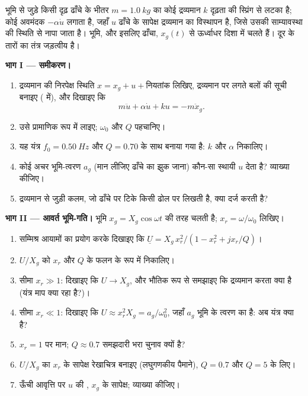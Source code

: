 \begin{problem}
\label{pb:b1:oscillators-resonance:1}
भूमि से जुड़े किसी दृढ़ ढाँचे के भीतर $m = \qty{1.0}{kg}$ का कोई द्रव्यमान
$k$ दृढ़ता की स्प्रिंग से लटका है; कोई अवमंदक $-\alpha\dot u$ लगाता है, जहाँ
$u$ ढाँचे के सापेक्ष द्रव्यमान का विस्थापन है, जिसे उसकी साम्यावस्था की
स्थिति से नापा जाता है। भूमि, और इसलिए ढाँचा, $x_g(t)$ से ऊर्ध्वाधर दिशा
में चलते हैं। दूर के तारों का तंत्र जड़त्वीय है।

\medskip
\noindent\textbf{भाग I --- समीकरण।}
\begin{enumerate}
  \item द्रव्यमान की निरपेक्ष स्थिति $x = x_g + u +
        \text{नियतांक}$ लिखिए, द्रव्यमान पर लगते बलों की सूची बनाइए
        ( में), और दिखाइए कि
        \[
        m\ddot u + \alpha\dot u + ku = -m\ddot x_g .
        \]
  \item उसे प्रामाणिक रूप में लाइए; $\omega_0$ और $Q$ पहचानिए।
  \item यह यंत्र $f_0 = \qty{0.50}{Hz}$ और $Q = 0.70$ के साथ बनाया गया है:
        $k$ और $\alpha$ निकालिए।
  \item कोई अचर भूमि-त्वरण $a_g$ (मान लीजिए ढाँचे का झुक जाना) कौन-सा
        स्थायी $u$ देता है? व्याख्या कीजिए।
  \item द्रव्यमान से जुड़ी कलम, जो ढाँचे पर टिके किसी ढोल पर लिखती है, क्या
        दर्ज करती है?
\end{enumerate}

\medskip
\noindent\textbf{भाग II --- आवर्त भूमि-गति।}
भूमि $x_g = X_g\cos\omega t$ की तरह चलती है; $x_r = \omega/\omega_0$ लिखिए।
\begin{enumerate}[resume]
  \item सम्मिश्र आयामों का प्रयोग करके दिखाइए कि $\underline U = X_g\,x_r^2/
        (1 - x_r^2 + jx_r/Q)$।
  \item $U/X_g$ को $x_r$ और $Q$ के फलन के रूप में निकालिए।
  \item सीमा $x_r \gg 1$: दिखाइए कि $U \to X_g$, और भौतिक रूप से समझाइए कि
        द्रव्यमान करता क्या है (यंत्र माप क्या रहा है?)।
  \item सीमा $x_r \ll 1$: दिखाइए कि $U \approx x_r^2X_g = a_g/\omega_0^2$,
        जहाँ $a_g$ भूमि के त्वरण का  है: अब यंत्र क्या है?
  \item $x_r = 1$ पर मान; $Q \approx 0.7$ समझदारी भरा चुनाव क्यों है?
  \item $U/X_g$ का $x_r$ के सापेक्ष रेखाचित्र बनाइए (लघुगणकीय पैमाने),
        $Q = 0.7$ और $Q = 5$ के लिए।
  \item ऊँची आवृत्ति पर $u$ की , $x_g$ के सापेक्ष; व्याख्या कीजिए।
\end{enumerate}


\end{problem}
